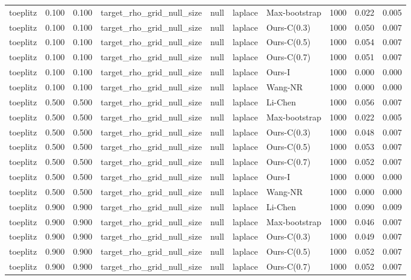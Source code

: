 \begin{tabular}{lrrllllrrr}
toeplitz & 0.100 & 0.100 & target\_rho\_grid\_null\_size & null & laplace & Max-bootstrap & 1000 & 0.022 & 0.005 \\
toeplitz & 0.100 & 0.100 & target\_rho\_grid\_null\_size & null & laplace & Ours-C(0.3) & 1000 & 0.050 & 0.007 \\
toeplitz & 0.100 & 0.100 & target\_rho\_grid\_null\_size & null & laplace & Ours-C(0.5) & 1000 & 0.054 & 0.007 \\
toeplitz & 0.100 & 0.100 & target\_rho\_grid\_null\_size & null & laplace & Ours-C(0.7) & 1000 & 0.051 & 0.007 \\
toeplitz & 0.100 & 0.100 & target\_rho\_grid\_null\_size & null & laplace & Ours-I & 1000 & 0.000 & 0.000 \\
toeplitz & 0.100 & 0.100 & target\_rho\_grid\_null\_size & null & laplace & Wang-NR & 1000 & 0.000 & 0.000 \\
toeplitz & 0.500 & 0.500 & target\_rho\_grid\_null\_size & null & laplace & Li-Chen & 1000 & 0.056 & 0.007 \\
toeplitz & 0.500 & 0.500 & target\_rho\_grid\_null\_size & null & laplace & Max-bootstrap & 1000 & 0.022 & 0.005 \\
toeplitz & 0.500 & 0.500 & target\_rho\_grid\_null\_size & null & laplace & Ours-C(0.3) & 1000 & 0.048 & 0.007 \\
toeplitz & 0.500 & 0.500 & target\_rho\_grid\_null\_size & null & laplace & Ours-C(0.5) & 1000 & 0.053 & 0.007 \\
toeplitz & 0.500 & 0.500 & target\_rho\_grid\_null\_size & null & laplace & Ours-C(0.7) & 1000 & 0.052 & 0.007 \\
toeplitz & 0.500 & 0.500 & target\_rho\_grid\_null\_size & null & laplace & Ours-I & 1000 & 0.000 & 0.000 \\
toeplitz & 0.500 & 0.500 & target\_rho\_grid\_null\_size & null & laplace & Wang-NR & 1000 & 0.000 & 0.000 \\
toeplitz & 0.900 & 0.900 & target\_rho\_grid\_null\_size & null & laplace & Li-Chen & 1000 & 0.090 & 0.009 \\
toeplitz & 0.900 & 0.900 & target\_rho\_grid\_null\_size & null & laplace & Max-bootstrap & 1000 & 0.046 & 0.007 \\
toeplitz & 0.900 & 0.900 & target\_rho\_grid\_null\_size & null & laplace & Ours-C(0.3) & 1000 & 0.049 & 0.007 \\
toeplitz & 0.900 & 0.900 & target\_rho\_grid\_null\_size & null & laplace & Ours-C(0.5) & 1000 & 0.052 & 0.007 \\
toeplitz & 0.900 & 0.900 & target\_rho\_grid\_null\_size & null & laplace & Ours-C(0.7) & 1000 & 0.052 & 0.007 \\

\end{tabular}

